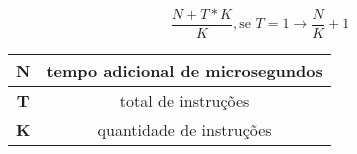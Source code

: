 \begin{question}

  \begin{equation}
    \frac{N + T*K}{K} , \text{se } T = 1 \rightarrow \frac{N}{K} + 1
  \end{equation}

  \begin{table}[ht]
    \centering 
    \begin{tabular}{|c|c|}
          \hline 
          \textbf{N} & tempo adicional de microsegundos \\ 
          \hline  
          \textbf{T} & total de instruções \\ 
          \hline 
          \textbf{K} & quantidade de instruções \\ 
          \hline 
    \end{tabular}
  \end{table}

\end{question}
